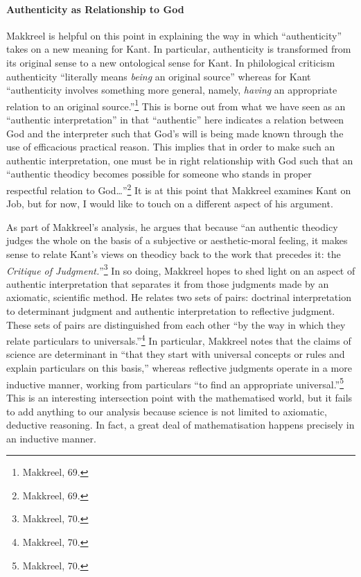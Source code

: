 \documentclass[12pt]{article}
\begin{document}
	\paragraph*{Authenticity as Relationship to God} Makkreel is helpful on this point in explaining the way in which ``authenticity'' takes on a new meaning for Kant. In particular, authenticity is transformed from its original sense to a new ontological sense for Kant. In philological criticism authenticity ``literally means \emph{being} an original source'' whereas for Kant ``authenticity involves something more general, namely, \emph{having} an appropriate relation to an original source.''\footnote{Makkreel, 69.} This is borne out from what we have seen as an ``authentic interpretation'' in that ``authentic'' here indicates a relation between God and the interpreter such that God's will is being made known through the use of efficacious practical reason. This implies that in order to make such an authentic interpretation, one must be in right relationship with God such that an ``authentic theodicy becomes possible for someone who stands in proper respectful relation to God\ldots''\footnote{Makkreel, 69.} It is at this point that Makkreel examines Kant on Job, but for now, I would like to touch on a different aspect of his argument.
	
	As part of Makkreel's analysis, he argues that because ``an authentic theodicy judges the whole on the basis of a subjective or aesthetic-moral feeling, it makes sense to relate Kant's views on theodicy back to the work that precedes it: the \emph{Critique of Judgment.}''\footnote{Makkreel, 70.} In so doing, Makkreel hopes to shed light on an aspect of authentic interpretation that separates it from those judgments made by an axiomatic, scientific method. He relates two sets of pairs: doctrinal interpretation to determinant judgment and authentic interpretation to reflective judgment. These sets of pairs are distinguished from each other ``by the way in which they relate particulars to universals.''\footnote{Makkreel, 70.} In particular, Makkreel notes that the claims of science are determinant in ``that they start with universal concepts or rules and explain particulars on this basis,'' whereas reflective judgments operate in a more inductive manner, working from particulars ``to find an appropriate universal.''\footnote{Makkreel, 70.} This is an interesting intersection point with the mathematised world, but it fails to add anything to our analysis because science is not limited to axiomatic, deductive reasoning. In fact, a great deal of mathematisation happens precisely in an inductive manner. 
	
\end{document}
